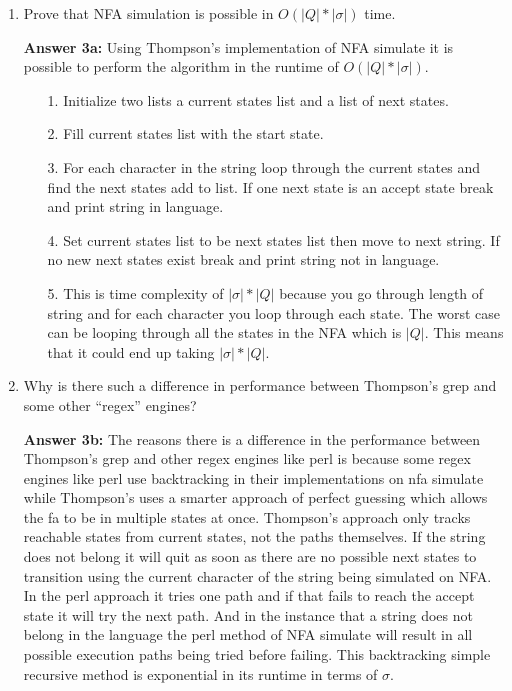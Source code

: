 \documentclass[12pt,letterpaper]{ntdhw}
\begin{document}
\begin{enumerate}
  \begin{enumerate}
    \item Prove that NFA simulation is possible in $O(|Q|*|\sigma|)$
      time.%
      \par \textbf{Answer 3a:} Using Thompson's implementation of NFA simulate it is possible to perform the algorithm in the runtime of $O(|Q|*|\sigma|)$. 
      \begin{enumerate}
          \item[1.] Initialize two lists a current states list and a list of next states.
          \item[2.]  Fill current states list with the start state.
          \item[3.] For each character in the string loop through the current states and find the next states add to list. If one next state is an accept state break and print string in language. 
          \item[4.] Set current states list to be next states list then move to next string. If no new next states exist break and print string not in language.
          \item[5.] This is time complexity of $|\sigma| * |Q|$ because you go through length of string and for each character you loop through each state. The worst case can be looping through all the states in the NFA which is $|Q|$. This means that it could end up taking  $|\sigma| * |Q|$.
      \end{enumerate}

    \item Why is there such a difference in performance between
      Thompson's grep and some other ``regex'' engines?
      \par \textbf{Answer 3b:} The reasons there is a difference in the performance between Thompson's grep and other regex engines like perl is because some regex engines like perl use backtracking in their implementations on nfa simulate while Thompson's uses a smarter approach of perfect guessing which allows the fa to be in multiple states at once. Thompson's approach only tracks reachable states from current states, not the paths themselves. If the string does not belong it will quit as soon as there are no possible next states to transition using the current character of the string being simulated on NFA. In the perl approach it tries one path and if that fails to reach the accept state it will try the next path. And in the instance that a string does not belong in the language the perl method of NFA simulate will result in all possible execution paths being tried before failing. This backtracking simple recursive method is exponential in its runtime in terms of $\sigma$. 
  \end{enumerate}




\end{enumerate}
\end{document}

